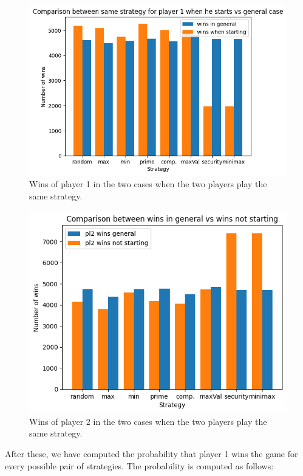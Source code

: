 \begin{figure}
    \centering
    \includegraphics[width=1\linewidth]{img/comparison_winning_starts_general_pl1.png}
    \caption{Wins of player 1 in the two cases when the two players play the same strategy.}
    \label{fig:comparison_pl1}
\end{figure}

\begin{figure}
    \centering
    \includegraphics[width=1\linewidth]{img/comparison_winning_not_starts_general_pl2.png}
    \caption{Wins of player 2 in the two cases when the two players play the same strategy.}
    \label{fig:comparison_pl2}
\end{figure}

After these, we have computed the probability that player 1 wins the game for every possible pair of strategies. The probability is computed as follows:

